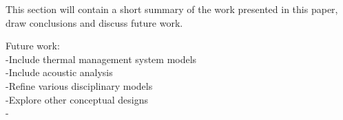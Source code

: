 

This section will contain a short summary of the work presented in this paper, draw conclusions and discuss future work.

Future work:\\
-Include thermal management system models\\
-Include acoustic analysis\\
-Refine various disciplinary models\\
-Explore other conceptual designs\\
-
